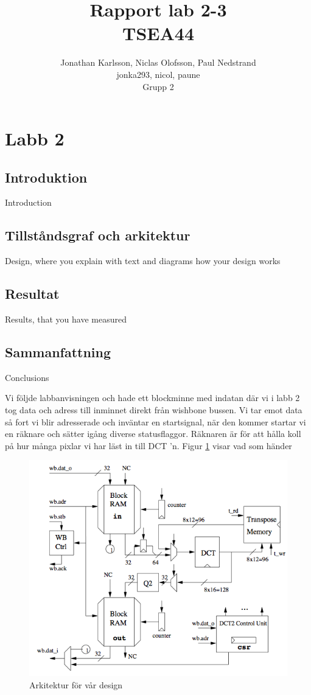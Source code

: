\documentclass[a4paper]{article}
\author{Jonathan Karlsson, Niclas Olofsson, Paul Nedstrand\\jonka293, nicol, paune\\Grupp 2}
\title{Rapport lab 2-3\\ \vspace{2 mm} {\large TSEA44}}
\begin{document}
\maketitle

\newpage

\tableofcontents

\newpage
\section{Labb 2}
\subsection{Introduktion}
Introduction
\subsection{Tillståndsgraf och arkitektur}
Design, where you explain with text and diagrams how your design works
\subsection{Resultat}
Results, that you have measured
\subsection{Sammanfattning}
Conclusions

Vi följde labbanvisningen och hade ett blockminne med indatan där vi i labb 2 tog data och adress till inminnet direkt från wishbone bussen. Vi tar emot data så fort vi blir adresserade och inväntar en startsignal, när den kommer startar vi en räknare och sätter igång diverse statusflaggor. Räknaren är för att hålla koll på hur många pixlar vi har läst in till DCT \rq{}n. Figur \ref{fig:architecture} visar vad som händer 

\begin{figure}[h]
\centering
\includegraphics[scale=0.5]{architecture.png}
\caption{Arkitektur för vår design}
\label{fig:architecture}
\end{figure}
\end{document}
